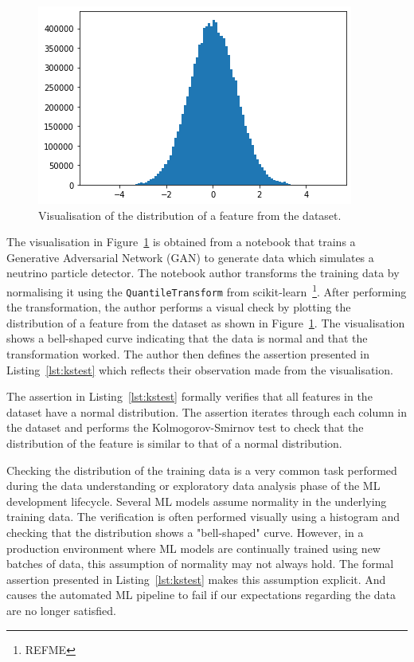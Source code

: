 \documentclass[conference]{IEEEtran}
\begin{document}
\begin{figure}
  \includegraphics[width=\linewidth]{../catalogue/select-152a.png}
  \caption{Visualisation of the distribution of a feature from the dataset.}\label{fig:kstest}
\end{figure}

The visualisation in Figure~\ref{fig:kstest} is obtained from a notebook that trains a Generative Adversarial Network (GAN) to generate data which simulates a neutrino particle detector. The notebook author transforms the training data by normalising it using the \texttt{QuantileTransform} from scikit-learn~\footnote{REFME}. After performing the transformation, the author performs a visual check by plotting the distribution of a feature from the dataset as shown in Figure~\ref{fig:kstest}. The visualisation shows a bell-shaped curve indicating that the data is normal and that the transformation worked. The author then defines the assertion presented in Listing~\ref{lst:kstest} which reflects their observation made from the visualisation.

The assertion in Listing~\ref{lst:kstest} formally verifies that all features in the dataset have a normal distribution. The assertion iterates through each column in the dataset and performs the Kolmogorov-Smirnov test to check that the distribution of the feature is similar to that of a normal distribution.

Checking the distribution of the training data is a very common task performed during the data understanding or exploratory data analysis phase of the ML development lifecycle. Several ML models assume normality in the underlying training data. The verification is often performed visually using a histogram and checking that the distribution shows a "bell-shaped" curve\cite{CITME}. However, in a production environment where ML models are continually trained using new batches of data, this assumption of normality may not always hold. The formal assertion presented in Listing~\ref{lst:kstest} makes this assumption explicit. And causes the automated ML pipeline to fail if our expectations regarding the data are no longer satisfied.
\end{document}
